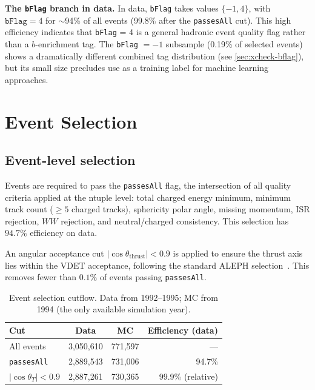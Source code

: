 \documentclass[11pt,a4paper]{article}
\begin{document}
\textbf{The \texttt{bFlag} branch in data.}
In data, \texttt{bFlag} takes values $\{-1, 4\}$, with
$\texttt{bFlag} = 4$ for $\sim$94\% of all events (99.8\% after
the \texttt{passesAll} cut).
This high efficiency indicates that \texttt{bFlag} = 4 is a
general hadronic event quality flag rather than a $b$-enrichment
tag.
The \texttt{bFlag} $= -1$ subsample (0.19\% of selected events)
shows a dramatically different combined tag distribution
(see \cref{sec:xcheck-bflag}), but its small size precludes
use as a training label for machine learning approaches.

\section{Event Selection}
\label{sec:selection}

\subsection{Event-level selection}
\label{sec:selection:event}

Events are required to pass the \texttt{passesAll} flag, the
intersection of all quality criteria applied at the ntuple level:
total charged energy minimum, minimum track count ($\geq 5$ charged
tracks), sphericity polar angle, missing momentum, ISR rejection,
$WW$ rejection, and neutral/charged consistency.
This selection has $94.7\%$ efficiency on data.

An angular acceptance cut $|\cos\theta_\text{thrust}| < 0.9$ is
applied to ensure the thrust axis lies within the VDET acceptance,
following the standard ALEPH selection~\cite{ALEPH:AFBb}.
This removes fewer than $0.1\%$ of events passing \texttt{passesAll}.

\begin{table}[htbp]
\centering
\caption{Event selection cutflow. Data from 1992--1995;
MC from 1994 (the only available simulation year).}
\label{tbl:cutflow}
\begin{tabular}{lccr}
\toprule
Cut & Data & MC & Efficiency (data) \\
\midrule
All events        & 3,050,610 & 771,597 & --- \\
\texttt{passesAll}& 2,889,543 & 731,006 & 94.7\% \\
$|\cos\theta_T| < 0.9$ & 2,887,261 & 730,365 & 99.9\% (relative) \\
\bottomrule
\end{tabular}
\end{table}
\end{document}
